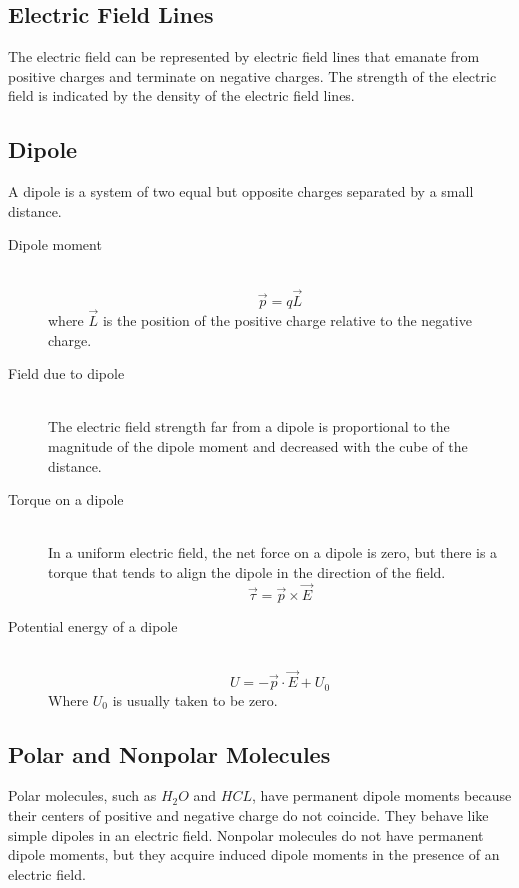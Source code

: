 \documentclass[../main.tex]{subfiles}
\begin{document}
\subsection{Electric Field Lines}\label{sub:electric_field_lines}

The electric field can be represented by electric field lines that emanate from
positive charges and terminate on negative charges. The strength of the
electric field is indicated by the density of the electric field lines.

\subsection{Dipole}\label{sub:dipole}

A dipole is a system of two equal but opposite charges separated by a small
distance.

\begin{description}
  \item[Dipole moment] \hfill \\ 
    \begin{equation}
      \vec{p} = q\vec{L}
    \end{equation}
    where \(\vec{L}\) is the position of the positive charge relative to the
    negative charge.
  \item[Field due to dipole] \hfill \\ The electric field strength far from a
    dipole is proportional to the magnitude of the dipole moment and decreased
    with the cube of the distance.
  \item[Torque on a dipole] \hfill \\ In a uniform electric field, the net
    force on a dipole is zero, but there is a torque that tends to align the
    dipole in the direction of the field.
    \begin{equation}
      \vec{\tau} = \vec{p}\times\vec{E}
    \end{equation}
  \item[Potential energy of a dipole] \hfill \\
    \begin{equation}
      U = -\vec{p}\cdot\vec{E}+U_0
    \end{equation}
    Where \(U_0\) is usually taken to be zero.
\end{description}

\subsection{Polar and Nonpolar Molecules}\label{sub:polar_and_nonpolar_molecules}

Polar molecules, such as \(H_2O\) and \(HCL\), have permanent dipole moments
because their centers of positive and negative charge do not coincide. They
behave like simple dipoles in an electric field. Nonpolar molecules do not have
permanent dipole moments, but they acquire induced dipole moments in the
presence of an electric field.
\end{document}
